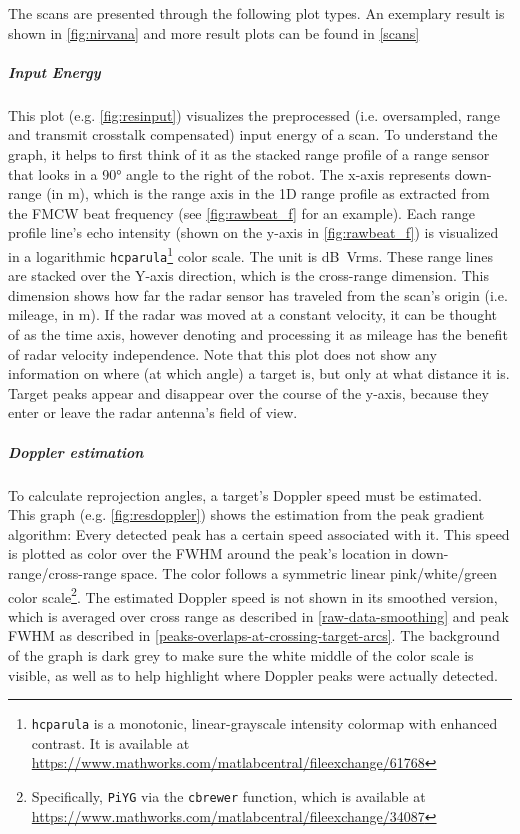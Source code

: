 The scans are presented through the following plot types. An exemplary result is shown in \cref{fig:nirvana} and more result plots can be found in \cref{scans}

\subparagraph{Input Energy}
This plot (e.g. \cref{fig:resinput}) visualizes the preprocessed (i.e. oversampled, range and transmit crosstalk compensated) input energy of a scan. To understand the graph, it helps to first think of it as the stacked range profile of a range sensor that looks in a \ang{90} angle to the right of the robot. The x-axis represents down-range (in \si{m}), which is the range axis in the 1D range profile as extracted from the FMCW beat frequency (see \cref{fig:rawbeat_f} for an example). Each range profile line's echo intensity (shown on the y-axis in \cref{fig:rawbeat_f}) is visualized in a logarithmic \texttt{hcparula}\footnote{\texttt{hcparula} is a monotonic, linear-grayscale intensity colormap with enhanced contrast. It is available at \url{https://www.mathworks.com/matlabcentral/fileexchange/61768}} color scale. The unit is \si{dB Vrms}. These range lines are stacked over the Y-axis direction, which is the cross-range dimension. This dimension shows how far the radar sensor has traveled from the scan's origin (i.e. mileage, in \si{m}). If the radar was moved at a constant velocity, it can be thought of as the time axis, however denoting and processing it as mileage has the benefit of radar velocity independence. Note that this plot does not show any information on where (at which angle) a target is, but only at what distance it is. Target peaks appear and disappear over the course of the y-axis, because they enter or leave the radar antenna's field of view.

\subparagraph{Doppler estimation}
To calculate reprojection angles, a target's Doppler speed must be estimated. This graph (e.g. \cref{fig:resdoppler}) shows the estimation from the peak gradient algorithm: Every detected peak has a certain speed associated with it. This speed is plotted as color over the FWHM around the peak's location in down-range/cross-range space. The color follows a symmetric linear pink/white/green color scale\footnote{Specifically, \texttt{PiYG} via the \texttt{cbrewer} function, which is available at \url{https://www.mathworks.com/matlabcentral/fileexchange/34087}}. The estimated Doppler speed is not shown in its smoothed version, which is averaged over cross range as described in \cref{raw-data-smoothing} and peak FWHM as described in \cref{peaks-overlaps-at-crossing-target-arcs}. The background of the graph is dark grey to make sure the white middle of the color scale is visible, as well as to help highlight where Doppler peaks were actually detected.

